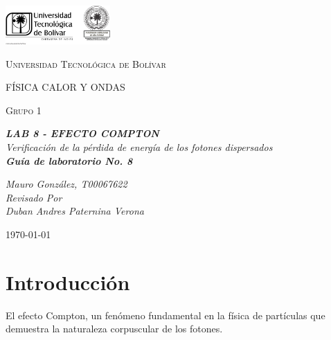 \documentclass[letterpaper, 12pt]{article}
\begin{document}
\begin{titlepage}
      \centering
      \includegraphics[width=0.3\textwidth]{Images/logo_utb.png}\par\vspace{1cm}
      {\scshape\LARGE Universidad Tecnológica de Bolívar \par}
      \vspace{1cm}

      {\scshape\Large FÍSICA CALOR Y ONDAS \par}
      \vspace{.2cm}

      {\scshape\Large Grupo 1 \par}
      \vspace{2cm}
      \slshape {\Large \bfseries{}LAB 8 - EFECTO COMPTON\\}
      \slshape {\large Verificación de la pérdida de
            energía de los fotones dispersados \\}
      \slshape {\small \bfseries{} Guía de laboratorio No. 8}
      \vspace{4cm}

      \slshape {\itshape{} Mauro González, T00067622 \\}
      \vfill
      Revisado Por \\
      Duban Andres Paternina Verona\\
      {\large \today\par}
\end{titlepage}

\section{Introducción}

El efecto Compton, un fenómeno fundamental en la física de
partículas que demuestra la naturaleza corpuscular de los
fotones.
\end{document}
